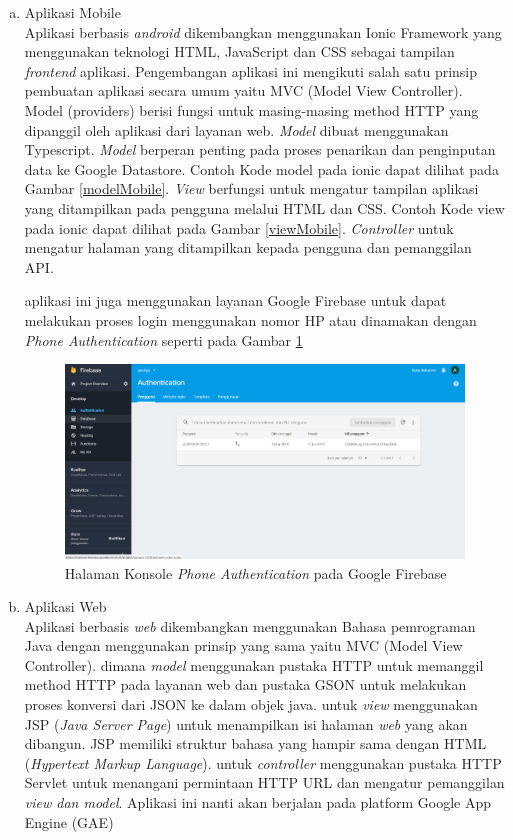 \begin{enumerate}[a.]
		\item Aplikasi Mobile
		\\ Aplikasi berbasis \textit{android} dikembangkan menggunakan Ionic Framework yang menggunakan teknologi HTML, JavaScript dan CSS sebagai tampilan \textit{frontend} aplikasi. Pengembangan aplikasi ini mengikuti salah satu prinsip pembuatan aplikasi secara umum yaitu MVC (Model View Controller). Model (providers) berisi fungsi untuk masing-masing method HTTP yang dipanggil oleh aplikasi dari layanan web. \textit{Model} dibuat menggunakan Typescript. \textit{Model} berperan penting pada proses penarikan dan penginputan data ke Google Datastore. Contoh Kode model pada ionic dapat dilihat pada Gambar \ref{modelMobile}. \textit{View} berfungsi untuk mengatur tampilan aplikasi yang ditampilkan pada pengguna melalui HTML dan CSS. Contoh Kode view pada ionic dapat dilihat pada Gambar \ref{viewMobile}. \textit{Controller} untuk mengatur halaman yang ditampilkan kepada pengguna dan pemanggilan API. \\
		
		\vspace{-0.4cm}
		
		
		 aplikasi ini juga menggunakan layanan Google Firebase untuk dapat melakukan proses login menggunakan nomor HP atau dinamakan dengan \textit{Phone Authentication} seperti pada Gambar \ref{firebaseAuth}
		
		\begin{figure}[H]
			\center
			\includegraphics [width = 12cm]{gambar/firebaseAuth}
			\caption{Halaman Konsole  \textit{Phone Authentication} pada Google Firebase}
			\label{firebaseAuth}
		\end{figure} 
	
		\item Aplikasi Web
		\\ Aplikasi berbasis \textit{web} dikembangkan menggunakan Bahasa pemrograman Java dengan menggunakan prinsip yang sama yaitu MVC (Model View Controller). dimana \textit{model} menggunakan pustaka HTTP untuk memanggil method HTTP pada layanan web dan pustaka GSON untuk melakukan proses konversi dari JSON ke dalam objek java. untuk \textit{view} menggunakan JSP (\textit{Java Server Page}) untuk menampilkan isi halaman \textit{web} yang akan dibangun. JSP memiliki struktur bahasa yang hampir sama dengan HTML (\textit{Hypertext Markup Language}). untuk \textit{controller} menggunakan pustaka HTTP Servlet untuk menangani permintaan HTTP URL dan mengatur pemanggilan \textit{view dan model}. Aplikasi ini nanti akan berjalan pada platform Google App Engine (GAE)\\
		

\end{enumerate}

